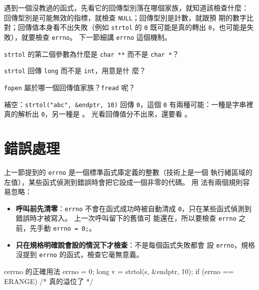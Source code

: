 遇到一個沒教過的函式，先看它的回傳型別落在哪個家族，就知道該檢查什麼：
回傳型別是可能無效的指標，就檢查 \texttt{NULL}；回傳型別是計數，就跟預
期的數字比對；回傳值本身看不出失敗（例如 \texttt{strtol} 的
\texttt{0} 既可能是真的轉出 \texttt{0}，也可能是失敗），就要檢查
\texttt{errno}。 下一節細講 \texttt{errno} 這個機制。


\begin{drills}[label=drills:sl-spec]
\item \texttt{strtol} 的第二個參數為什麼是 \texttt{char **} 而不是
\texttt{char *}？
\item \texttt{strtol} 回傳 \texttt{long} 而不是 \texttt{int}，用意是什
麼？
\item \texttt{fopen} 屬於哪一個回傳值家族？\texttt{fread} 呢？
\item 補空：\texttt{strtol("abc", \&endptr, 10)} 回傳 \texttt{0}，這個
\texttt{0} 有兩種可能：一種是字串裡真的解析出 \texttt{0}，另一種是
\underline{\hspace{2em}}。 光看回傳值分不出來，還要看
\underline{\hspace{2em}}。
\end{drills}

\section{錯誤處理}
\label{sec:sl-errors}

上一節提到的 \texttt{errno} 是一個標準函式庫定義的整數（技術上是一個
執行緒區域的左值），某些函式偵測到錯誤時會把它設成一個非零的代碼。 用
法有兩個規則容易忽略：

\begin{itemize}
\item \textbf{呼叫前先清零}：\texttt{errno} 不會在函式成功時被自動清成
\texttt{0}，只在某些函式偵測到錯誤時才被寫入。 上一次呼叫留下的舊值可
能還在，所以要檢查 \texttt{errno} 之前，先手動 \texttt{errno = 0;}。
\item \textbf{只在規格明確說會設的情況下才檢查}：不是每個函式失敗都會
設 \texttt{errno}，規格沒提到 \texttt{errno} 的函式，檢查它毫無意義。
\end{itemize}

\begin{code}{c}{errno 的正確用法}
errno = 0;
long v = strtol(s, &endptr, 10);
if (errno == ERANGE) {
    /* 真的溢位了 */
}
\end{code}

